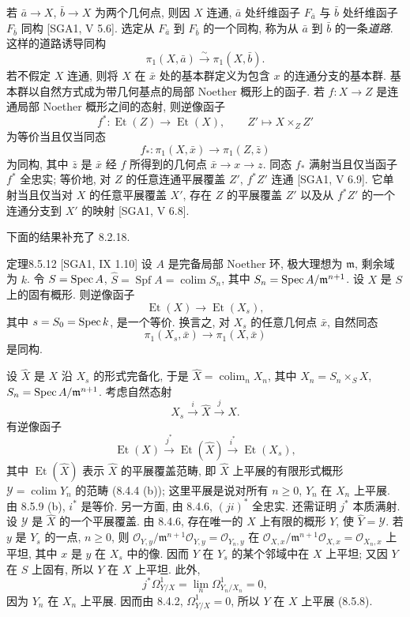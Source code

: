 若 $\bar a\to X$, $\bar b\to X$ 为两个几何点, 则因 $X$ 连通, $\bar a$ 处纤维函子 $F_{\bar a}$ 与 $\bar b$ 处纤维函子 $F_{\bar b}$ 同构 [SGA1, V 5.6]. 选定从 $F_{\bar a}$ 到 $F_{\bar b}$ 的一个同构, 称为从 $\bar a$ 到 $\bar b$ 的一条\emph{道路}. 这样的道路诱导同构
\begin{equation}\pi_1(X,\bar a)\xrightarrow\sim\pi_1(X,\bar b).\tag{8.5.11.5}\label{ch08:eq85115}\end{equation}
若不假定 $X$ 连通, 则将 $X$ 在 $\bar x$ 处的基本群定义为包含 $x$ 的连通分支的基本群. 基本群以自然方式成为带几何基点的局部 Noether 概形上的函子. 若 $f:X\to Z$ 是连通局部 Noether 概形之间的态射, 则逆像函子
\[f^*:\operatorname{Et}(Z)\longrightarrow\operatorname{Et}(X),\qquad Z'\longmapsto X\times_ZZ'\]
为等价当且仅当同态
\[f_*:\pi_1(X,\bar x)\longrightarrow\pi_1(Z,\bar z)\]
为同构, 其中 $\bar z$ 是 $\bar x$ 经 $f$ 所得到的几何点 $\bar x\to x\to z$. 同态 $f_*$ 满射当且仅当函子 $f^*$ 全忠实; 等价地, 对 $Z$ 的任意连通平展覆盖 $Z'$, $f^*Z'$ 连通 [SGA1, V 6.9]. 它单射当且仅当对 $X$ 的任意平展覆盖 $X'$, 存在 $Z$ 的平展覆盖 $Z'$ 以及从 $f^*Z'$ 的一个连通分支到 $X'$ 的映射 [SGA1, V 6.8].

下面的结果补充了 8.2.18.
\begin{origstatement}{定理}{8.5.12}\label{ch08:th8512}
[SGA1, IX 1.10] 设 $A$ 是完备局部 Noether 环, 极大理想为 $\mathfrak m$, 剩余域为 $k$. 令 $S=\operatorname{Spec} A$, $\widehat S=\operatorname{Spf}A=\operatorname{colim}S_n$, 其中 $S_n=\operatorname{Spec} A/\mathfrak m^{n+1}$. 设 $X$ 是 $S$ 上的固有概形. 则逆像函子
\[\operatorname{Et}(X)\longrightarrow\operatorname{Et}(X_s),\]
其中 $s=S_0=\operatorname{Spec} k$, 是一个等价. 换言之, 对 $X_s$ 的任意几何点 $\bar x$, 自然同态
\[\pi_1(X_s,\bar x)\longrightarrow\pi_1(X,\bar x)\]
是同构.
\end{origstatement}
设 $\widehat X$ 是 $X$ 沿 $X_s$ 的形式完备化, 于是 $\widehat X=\operatorname{colim}_nX_n$, 其中 $X_n=S_n\times_SX$, $S_n=\operatorname{Spec} A/\mathfrak m^{n+1}$. 考虑自然态射
\[X_s\xrightarrow{i}\widehat X\xrightarrow{j}X.\]
有逆像函子
\[\operatorname{Et}(X)\xrightarrow{j^*}\operatorname{Et}(\widehat X)\xrightarrow{i^*}\operatorname{Et}(X_s),\]
其中 $\operatorname{Et}(\widehat X)$ 表示 $\widehat X$ 的平展覆盖范畴, 即 $\widehat X$ 上平展的有限形式概形 $\mathcal Y=\operatorname{colim}Y_n$ 的范畴 (8.4.4 (b)); 这里平展是说对所有 $n\geq0$, $Y_n$ 在 $X_n$ 上平展. 由 8.5.9 (b), $i^*$ 是等价. 另一方面, 由 8.4.6, $(ji)^*$ 全忠实. 还需证明 $j^*$ 本质满射. 设 $\mathcal Y$ 是 $\widehat X$ 的一个平展覆盖. 由 8.4.6, 存在唯一的 $X$ 上有限的概形 $Y$, 使 $\widehat Y=\mathcal Y$. 若 $y$ 是 $Y_s$ 的一点, $n\geq0$, 则 $\mathcal O_{Y,y}/\mathfrak m^{n+1}\mathcal O_{Y,y}=\mathcal O_{Y_n,y}$ 在 $\mathcal O_{X,x}/\mathfrak m^{n+1}\mathcal O_{X,x}=\mathcal O_{X_n,x}$ 上平坦, 其中 $x$ 是 $y$ 在 $X_s$ 中的像. 因而 $Y$ 在 $Y_s$ 的某个邻域中在 $X$ 上平坦; 又因 $Y$ 在 $S$ 上固有, 所以 $Y$ 在 $X$ 上平坦. 此外,
\[j^*\Omega^1_{Y/X}=\lim_n\Omega^1_{Y_n/X_n}=0,\]
因为 $Y_n$ 在 $X_n$ 上平展. 因而由 8.4.2, $\Omega^1_{Y/X}=0$, 所以 $Y$ 在 $X$ 上平展 (8.5.8).

